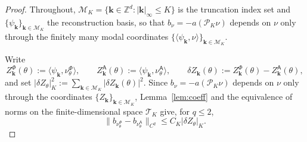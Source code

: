 \documentclass[a4paper,fleqn]{cas-sc}
\theoremstyle{definition}
\theoremstyle{remark}
\begin{document}
\begin{proof}
Throughout,
$\mathcal M_K=\{\mathbf k\in\mathbb Z^d:|\mathbf k|_\infty\le K\}$ is the truncation index
set and $\{\psi_{\mathbf k}\}_{\mathbf k\in\mathcal M_K}$ the reconstruction basis, so that
$b_\nu=-a(\mathcal P_K\nu)$ depends on $\nu$ only through the finitely many modal
coordinates $\{\langle\psi_{\mathbf k},\nu\rangle\}_{\mathbf k\in\mathcal M_K}$.

Write
\[
Z_{\mathbf k}^\Phi(\theta):=\langle\psi_{\mathbf k},\nu^\Phi_\theta\rangle,\qquad
Z_{\mathbf k}^{\mathsf A}(\theta):=\langle\psi_{\mathbf k},\nu^{\mathsf A}_\theta\rangle,\qquad
\delta Z_{\mathbf k}(\theta):=Z_{\mathbf k}^\Phi(\theta)-Z_{\mathbf k}^{\mathsf A}(\theta),
\]
and set
$|\delta Z_\theta|_K^2:=\sum_{\mathbf k\in\mathcal M_K}|\delta Z_{\mathbf k}(\theta)|^2$.
Since $b_\nu=-a(\mathcal P_K\nu)$ depends on $\nu$ only through the coordinates
$\{Z_{\mathbf k}\}_{\mathbf k\in\mathcal M_K}$, Lemma~\ref{lem:coeff} and the equivalence of
norms on the finite-dimensional space $\mathcal T_K$ give, for $q\le2$,
\begin{equation}\label{eq:L4-coeff}
\|b_{\nu^\Phi_\theta}-b_{\nu^{\mathsf A}_\theta}\|_{C^q}\le C_K|\delta Z_\theta|_K .
\end{equation}


\end{proof}
\end{document}
